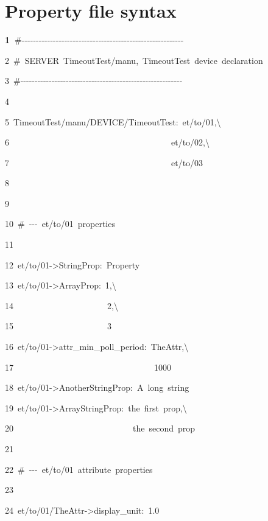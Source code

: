 \section{Property file syntax}


\begin{lyxcode}
\textbf{1~}\#-{}-{}-{}-{}-{}-{}-{}-{}-{}-{}-{}-{}-{}-{}-{}-{}-{}-{}-{}-{}-{}-{}-{}-{}-{}-{}-{}-{}-{}-{}-{}-{}-{}-{}-{}-{}-{}-{}-{}-{}-{}-{}-{}-{}-{}-{}-{}-{}-{}-{}-{}-{}-{}-{}-{}-{}-

2~\#~SERVER~TimeoutTest/manu,~TimeoutTest~device~declaration

3~\#-{}-{}-{}-{}-{}-{}-{}-{}-{}-{}-{}-{}-{}-{}-{}-{}-{}-{}-{}-{}-{}-{}-{}-{}-{}-{}-{}-{}-{}-{}-{}-{}-{}-{}-{}-{}-{}-{}-{}-{}-{}-{}-{}-{}-{}-{}-{}-{}-{}-{}-{}-{}-{}-{}-{}-{}-

4~

5~TimeoutTest/manu/DEVICE/TimeoutTest:~\textquotedbl{}et/to/01\textquotedbl{},\textbackslash{}~

6~~~~~~~~~~~~~~~~~~~~~~~~~~~~~~~~~~~~~~\textquotedbl{}et/to/02\textquotedbl{},\textbackslash{}~

7~~~~~~~~~~~~~~~~~~~~~~~~~~~~~~~~~~~~~~\textquotedbl{}et/to/03\textquotedbl{}

8~

9~

10~\#~-{}-{}-~et/to/01~properties

11~

12~et/to/01->StringProp:~Property

13~et/to/01->ArrayProp:~1,\textbackslash{}~

14~~~~~~~~~~~~~~~~~~~~~~2,\textbackslash{}~

15~~~~~~~~~~~~~~~~~~~~~~3

16~et/to/01->attr\_min\_poll\_period:~TheAttr,\textbackslash{}~

17~~~~~~~~~~~~~~~~~~~~~~~~~~~~~~~~~1000

18~et/to/01->AnotherStringProp:~\textquotedbl{}A~long~string\textquotedbl{}

19~et/to/01->ArrayStringProp:~\textquotedbl{}the~first~prop\textquotedbl{},\textbackslash{}~

20~~~~~~~~~~~~~~~~~~~~~~~~~~~~\textquotedbl{}the~second~prop\textquotedbl{}

21~

22~\#~-{}-{}-~et/to/01~attribute~properties

23~

24~et/to/01/TheAttr->display\_unit:~1.0


\end{lyxcode}
